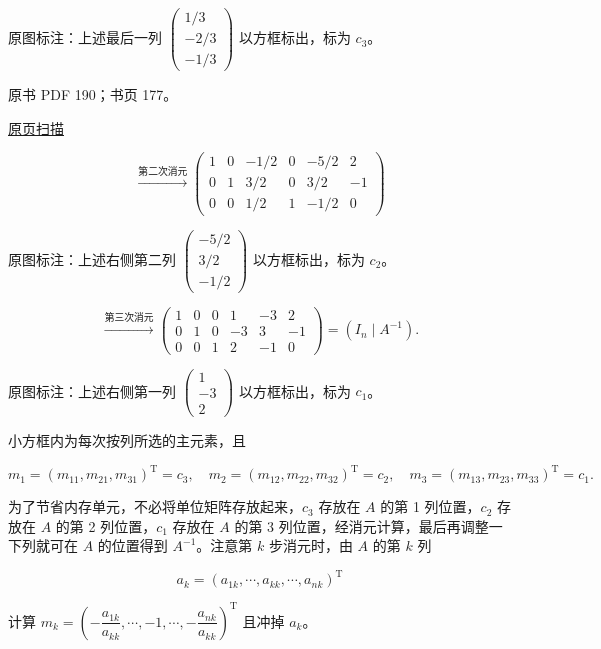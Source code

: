 \documentclass[
  10pt,
  fontset=fandol]{ctexart}
\begin{document}
原图标注：上述最后一列 \(\begin{pmatrix}1/3\\-2/3\\-1/3\end{pmatrix}\) 以方框标出，标为 \(c_3\)。

\clearpage

原书 PDF 190；书页 177。

\href{../../../source-images/pdf-190.jpeg}{原页扫描}

\[
\xrightarrow{\text{第二次消元}}
\left(\begin{array}{rrr|rrr}
1&0&-1/2&0&-5/2&2\\
0&1&3/2&0&3/2&-1\\
0&0&\boxed{1/2}&1&-1/2&0
\end{array}\right)
\]

原图标注：上述右侧第二列 \(\begin{pmatrix}-5/2\\3/2\\-1/2\end{pmatrix}\) 以方框标出，标为 \(c_2\)。

\[
\xrightarrow{\text{第三次消元}}
\left(\begin{array}{rrr|rrr}
1&0&0&1&-3&2\\
0&1&0&-3&3&-1\\
0&0&1&2&-1&0
\end{array}\right)=(I_n\mid A^{-1}).
\]

原图标注：上述右侧第一列 \(\begin{pmatrix}1\\-3\\2\end{pmatrix}\) 以方框标出，标为 \(c_1\)。

小方框内为每次按列所选的主元素，且

\[m_1=(m_{11},m_{21},m_{31})^{\mathrm T}=c_3,\quad
m_2=(m_{12},m_{22},m_{32})^{\mathrm T}=c_2,\quad
m_3=(m_{13},m_{23},m_{33})^{\mathrm T}=c_1.\]

为了节省内存单元，不必将单位矩阵存放起来，\(c_3\) 存放在 \(A\) 的第 1 列位置，\(c_2\) 存放在 \(A\) 的第 2 列位置，\(c_1\) 存放在 \(A\) 的第 3 列位置，经消元计算，最后再调整一下列就可在 \(A\) 的位置得到 \(A^{-1}\)。注意第 \(k\) 步消元时，由 \(A\) 的第 \(k\) 列

\[a_k=(a_{1k},\cdots,a_{kk},\cdots,a_{nk})^{\mathrm T}\]

计算 \(m_k=\left(-\dfrac{a_{1k}}{a_{kk}},\cdots,-1,\cdots,-\dfrac{a_{nk}}{a_{kk}}\right)^{\mathrm T}\) 且冲掉 \(a_k\)。
\end{document}
